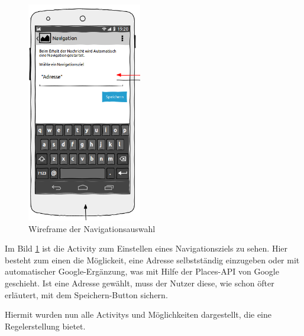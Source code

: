 \FloatBarrier
\begin{figure}
\vspace{-13pt}
\includegraphics[width=5cm]{Bilder/WireframeNaviAuswahl.png}
\caption{Wireframe der Navigationsauswahl}
\label{Wireframe NaviAuswahl}
\vspace{-230pt}
\end{figure}
Im Bild \ref{Wireframe NaviAuswahl} ist die Activity zum Einstellen eines Navigationsziels zu sehen. Hier besteht zum einen die M\"oglickeit, eine Adresse selbstst\"andig einzugeben oder mit automatischer Google-Erg\"anzung, was mit Hilfe der Places-\ac{API} von Google geschieht. Ist eine Adresse gew\"ahlt, muss der Nutzer diese, wie schon \"ofter erl\"autert, mit dem Speichern-Button sichern.

Hiermit wurden nun alle Activitys und M\"oglichkeiten dargestellt, die eine Regelerstellung bietet.
\newpage

